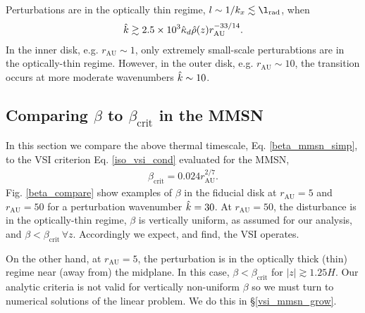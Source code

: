Perturbations are in the optically thin regime,
$l\sim 1/k_x \lesssim\l_\mathrm{rad}$, when 
\begin{align}
  \hat{k}\gtrsim 2.5\times10^3\hat{\kappa}_d\hat{\rho}(z)r_\mathrm{AU}^{-33/14}.  
\end{align}
In the inner disk, e.g. $r_\mathrm{AU}\sim 1$, only
extremely small-scale perturabtions are in the optically-thin
regime. However, in the outer disk, e.g. $r_\mathrm{AU}\sim 10$, the transition
occurs at more moderate wavenumbers $\hat{k}\sim 10$.


\subsection{Comparing $\beta$ to $\beta_\mathrm{crit}$ in the MMSN} 
In this section we compare the above thermal timescale, Eq. \ref{beta_mmsn_simp}, to 
the VSI criterion Eq. \ref{iso_vsi_cond} evaluated for the MMSN,     
\begin{align}\label{bcrit_mmsn}
  \beta_\mathrm{crit} = 0.024r_\mathrm{AU}^{2/7}. 
\end{align}
Fig. \ref{beta_compare} show examples of $\beta$ in the fiducial disk
at $r_\mathrm{AU}=5$ and $r_\mathrm{AU}=50$ for a perturbation wavenumber $\hat{k}=30$.  
At $r_\mathrm{AU}=50$, the disturbance is in the optically-thin regime,  
$\beta$ is vertically uniform, as assumed for our analysis, and $\beta
< \beta_\mathrm{crit}\, \forall z$. Accordingly we expect, and find, the VSI
operates.     

On the other hand, at $r_\mathrm{AU}=5$, the perturbation is in the optically
thick (thin) regime near (away from) the midplane. In this case,
$\beta < \beta_\mathrm{crit}$ for $|z|\gtrsim1.25H$. Our analytic 
criteria is not valid for vertically non-uniform $\beta$ so we must
turn to numerical solutions of the linear problem. We do this in
\S\ref{vsi_mmsn_grow}. %

